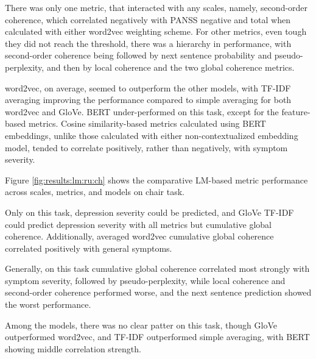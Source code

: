There was only one metric, that interacted with any scales, namely, second-order coherence, which correlated negatively with PANSS negative and total when calculated with either word2vec weighting scheme. For other metrics, even tough they did not reach the threshold, there was a hierarchy in performance, with second-order coherence being followed by next sentence probability and pseudo-perplexity, and then by local coherence and the two global coherence metrics. 


word2vec, on average, seemed to outperform the other models, with TF-IDF averaging improving the performance compared to simple averaging for both word2vec and GloVe. BERT under-performed on this task, except for the feature-based metrics. Cosine similarity-based metrics calculated using BERT embeddings, unlike those calculated with either non-contextualized embedding model, tended to correlate positively, rather than negatively, with symptom severity.


Figure \ref{fig:results:lm:ru:ch} shows the comparative LM-based metric performance across scales, metrics, and models on chair task. 

Only on this task, depression severity could be predicted, and GloVe TF-IDF could predict depression severity with all metrics but cumulative global coherence. Additionally, averaged word2vec cumulative global coherence correlated positively with general symptoms. 

Generally, on this task cumulative global coherence correlated most strongly with symptom severity, followed by pseudo-perplexity, while local coherence and second-order coherence performed worse, and the next sentence prediction showed the worst performance. 

Among the models, there was no clear patter on this task, though GloVe outperformed word2vec, and TF-IDF outperformed simple averaging, with BERT showing middle correlation strength.


